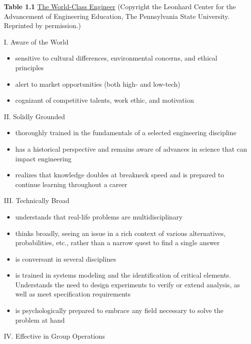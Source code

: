 \documentclass[a4paper,10pt]{book}
\begin{document}
\textbf{Table 1.1} \underline{The World-Class Engineer} (Copyright the Leonhard
Center for the Advancement of Engineering Education, The Pennsylvania
State University. Reprinted by permission.)

I. Aware of the World

\begin{itemize}
\item
  sensitive to cultural differences, environmental concerns, and ethical
  principles
\item
  alert to market opportunities (both high- and low-tech)
\item
  cognizant of competitive talents, work ethic, and motivation
\end{itemize}

II. Solidly Grounded

\begin{itemize}
\item
  thoroughly trained in the fundamentals of a selected engineering
  discipline
\item
  has a historical perspective and remains aware of advances in science
  that can impact engineering
\item
  realizes that knowledge doubles at breakneck speed and is prepared to
  continue learning throughout a career
\end{itemize}

III. Technically Broad

\begin{itemize}
\item
  understands that real-life problems are multidisciplinary
\item
  thinks broadly, seeing an issue in a rich context of various
  alternatives, probabilities, etc., rather than a narrow quest to find
  a single answer
\item
  is conversant in several disciplines
\item
  is trained in systems modeling and the identification of critical
  elements. Understands the need to design experiments to verify or
  extend analysis, as well as meet specification requirements
\item
  is psychologically prepared to embrace any field necessary to solve
  the problem at hand
\end{itemize}

IV. Effective in Group Operations
\end{document}
